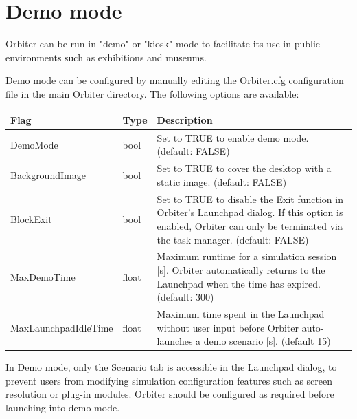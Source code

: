 \documentclass[Orbiter User Manual.tex]{subfiles}
\begin{document}
\section{Demo mode}
\label{sec:demo}
Orbiter can be run in "demo" or "kiosk" mode to facilitate its use in public
environments such as exhibitions and museums.

Demo mode can be configured by manually editing the Orbiter.cfg configuration
file in the main Orbiter directory. The following options are available:

	\begin{longtable}{ p{} p{}
		>{\RaggedRight}p{}  }
	\hline
	\textbf{Flag} & \textbf{Type} & \textbf{Description}\\
	\hline
	DemoMode & bool & Set to TRUE to enable demo mode. (default: FALSE)\\
	\hline
	BackgroundImage & bool &
		Set to TRUE to cover the desktop with a static image. (default: FALSE)\\
	\hline
	BlockExit & bool &
		Set to TRUE to disable the Exit function in Orbiter's Launchpad dialog.
		If this option is enabled, Orbiter can only be terminated via the task
		manager. (default: FALSE)\\
	\hline
	MaxDemoTime & float &
		Maximum runtime for a simulation session [s]. Orbiter automatically
		returns to the Launchpad when the time has expired. (default: 300)\\
	\hline
	MaxLaunchpadIdleTime &
		float & Maximum time spent in the Launchpad without user input before
		Orbiter auto-launches a demo scenario [s]. (default 15)\\
	\hline
	\end{longtable}

In Demo mode, only the Scenario tab is accessible in the Launchpad dialog, to
prevent users from modifying simulation configuration features such as screen
resolution or plug-in modules. Orbiter should be configured as required before
launching into demo mode.


\end{document}

